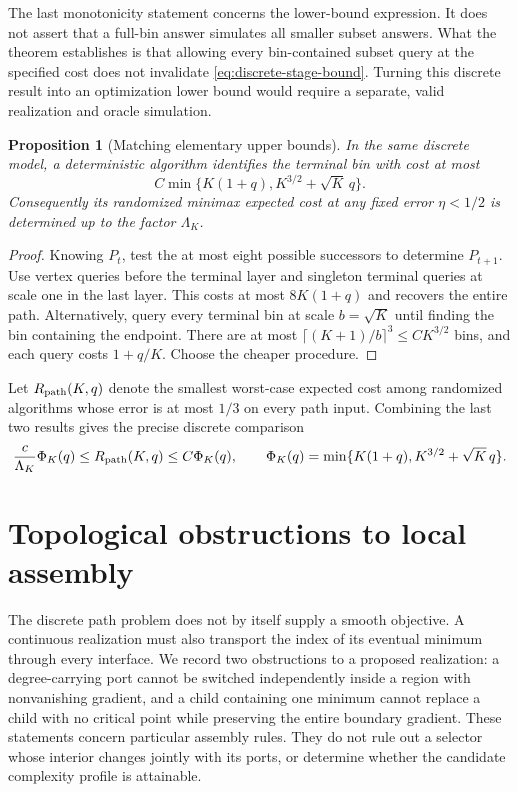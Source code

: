 \documentclass[11pt,a4paper]{article}
\newtheorem{proposition}[theorem]{Proposition}
\theoremstyle{definition}
\theoremstyle{remark}
\begin{document}
The last monotonicity statement concerns the lower-bound expression.
It does not assert that a full-bin answer simulates all smaller subset
answers.  What the theorem establishes is that allowing every bin-contained
subset query at the specified cost does not invalidate
\eqref{eq:discrete-stage-bound}.  Turning this discrete result into an
optimization lower bound would require a separate, valid realization and
oracle simulation.

\begin{proposition}[Matching elementary upper bounds]
\label{prop:discrete-upper}
In the same discrete model, a deterministic algorithm identifies the
terminal bin with cost at most
\[
 C\min\{K(1+q),K^{3/2}+\sqrt K\,q\}.
\]
Consequently its randomized minimax expected cost at any fixed error
$\eta<1/2$ is determined up to the factor $\Lambda_K$.
\end{proposition}

\begin{proof}
Knowing $P_t$, test the at most eight possible successors to determine
$P_{t+1}$.  Use vertex queries before the terminal layer and singleton
terminal queries at scale one in the last layer.  This costs at most
$8K(1+q)$ and recovers the entire path.
Alternatively, query every terminal bin at scale $b=\sqrt K$ until finding
the bin containing the endpoint.  There are at most
$\lceil(K+1)/b\rceil^3\le C K^{3/2}$ bins, and each query costs $1+q/K$.
Choose the cheaper procedure.
\end{proof}

Let $R_{\rm path}(K,q)$ denote the smallest worst-case expected cost among
randomized algorithms whose error is at most $1/3$ on every path input.
Combining the last two results gives the precise discrete comparison
\begin{equation}
 \frac{c}{\Lambda_K}\Phi_K(q)
 \le R_{\rm path}(K,q)\le C\Phi_K(q),\qquad
 \Phi_K(q)=\min\{K(1+q),K^{3/2}+\sqrt K\,q\}.
 \label{eq:discrete-matching}
\end{equation}


\section{Topological obstructions to local assembly}
\label{sec:topological-obstructions}

The discrete path problem does not by itself supply a smooth objective.
A continuous realization must also transport the index of its eventual
minimum through every interface.  We record two obstructions to a proposed
realization: a degree-carrying port cannot be switched independently inside
a region with nonvanishing gradient, and a child containing one minimum
cannot replace a child with no critical point while preserving the entire
boundary gradient.  These statements concern particular assembly rules.
They do not rule out a selector whose interior changes jointly with its
ports, or determine whether the candidate complexity profile is attainable.
\end{document}
